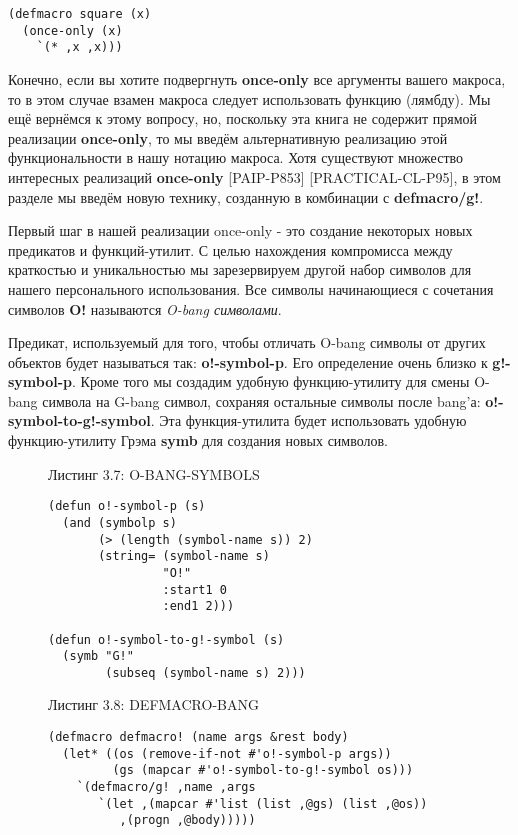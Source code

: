 \begin{verbatim}
(defmacro square (x)
  (once-only (x)
    `(* ,x ,x)))
\end{verbatim}

Конечно, если вы хотите подвергнуть \textbf{once-only} все аргументы вашего макроса, то в этом случае взамен макроса следует использовать функцию (лямбду). Мы ещё вернёмся к этому вопросу, но, поскольку эта книга не содержит прямой реализации \textbf{once-only}, то мы введём альтернативную реализацию этой функциональности в нашу нотацию макроса. Хотя существуют множество интересных реализаций \textbf{once-only} [PAIP-P853] [PRACTICAL-CL-P95], в этом разделе мы введём новую технику, созданную в комбинации с \textbf{defmacro/g!}.

Первый шаг в нашей реализации once-only - это создание некоторых новых предикатов и функций-утилит. С целью нахождения компромисса между краткостью и уникальностью мы зарезервируем другой набор символов для нашего персонального использования. Все символы начинающиеся с сочетания символов \textbf{O!} называются \emph{O-bang символами}.

Предикат, используемый для того, чтобы отличать O-bang символы от других объектов будет называться так: \textbf{o!-symbol-p}. Его определение очень близко к \textbf{g!-symbol-p}. Кроме того мы создадим удобную функцию-утилиту для смены O-bang символа на G-bang символ, сохраняя остальные символы после bang'а: \textbf{o!-symbol-to-g!-symbol}. Эта функция-утилита будет использовать удобную функцию-утилиту Грэма \textbf{symb} для создания новых символов.

\begin{figure}Листинг 3.7: O-BANG-SYMBOLS\label{listing_3.7}
\listbegin
\begin{verbatim}
(defun o!-symbol-p (s)
  (and (symbolp s)
       (> (length (symbol-name s)) 2)
       (string= (symbol-name s)
                "O!"
                :start1 0
                :end1 2)))

(defun o!-symbol-to-g!-symbol (s)
  (symb "G!"
        (subseq (symbol-name s) 2)))
\end{verbatim}
\listend
\end{figure}

\begin{figure}Листинг 3.8: DEFMACRO-BANG\label{listing_3.8}
\listbegin
\begin{verbatim}
(defmacro defmacro! (name args &rest body)
  (let* ((os (remove-if-not #'o!-symbol-p args))
         (gs (mapcar #'o!-symbol-to-g!-symbol os)))
    `(defmacro/g! ,name ,args
       `(let ,(mapcar #'list (list ,@gs) (list ,@os))
          ,(progn ,@body)))))
\end{verbatim}
\listend
\end{figure}

